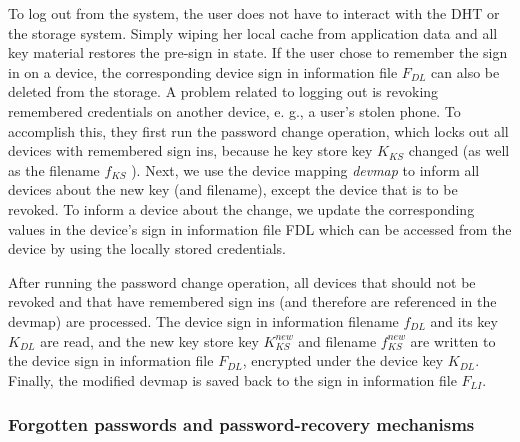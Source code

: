 To log out from the system, the user does not have to interact
with the DHT or the storage system. Simply wiping her local
cache from application data and all key material restores the
pre-sign in state. If the user chose to remember the sign in on a
device, the corresponding device sign in information file $F_{DL}$
can also be deleted from the storage.
 A problem related to logging out is revoking remembered
credentials on another device, e. g., a user’s stolen phone. To
accomplish this, they first run the password change operation,
which locks out all devices with remembered sign ins, because
he key store key $K_{KS}$ changed (as well as the filename $f_{KS}$ ).
Next, we use the device mapping \textit{devmap} to inform all devices
about the new key (and filename), except the device that is to
be revoked. To inform a device about the change, we update
the corresponding values in the device’s sign in information file
 FDL which can be accessed from the device by using the
locally stored credentials.

 After running the password change
operation, all devices that should not be revoked and that have remembered
sign ins (and therefore are referenced in the devmap) are
processed. The device sign in information filename $f_{DL}$ and its key $K_{DL}$ are read,
and the new key store key $K_{KS}^{new}$ and filename $f_{KS}^{new}$ are written to the
device sign in information file $F_{DL}$, encrypted under the device key $K_{DL}$.
Finally, the modified devmap is saved back to the sign in information file $F_{LI}$.


\subsubsection{Forgotten passwords and password-recovery mechanisms}

